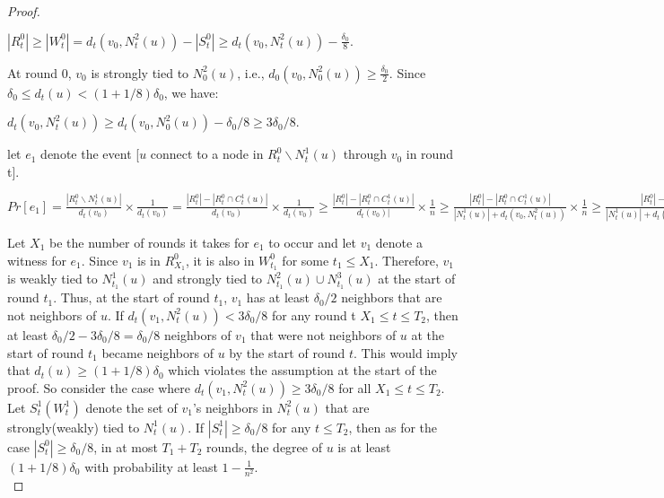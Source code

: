 \documentclass[
10pt, %
a4paper, %
oneside, %
headinclude,footinclude, %
BCOR5mm, %
]{scrartcl}
\begin{document}
\begin{proof}
	\begin{center}
		\begin{math}
		|R_t^0| \geq |W_t^0| = d_t(v_0, N_t^2(u)) - |S_t^0| \geq d_t(v_0, N_t^2(u)) - \frac{\delta_0}{8}. 
		\end{math}
	\end{center}
	At round $0$, $v_0$ is strongly tied to $N_0^2(u)$, i.e., $d_0(v_0, N_0^2(u)) \geq \frac{\delta_0}{2}$.
	Since $\delta_0 \leq d_t(u) < (1 + 1/8)\delta_0$, we have:
	\begin{center}
		\begin{math}
		d_t(v_0, N_t^2(u)) \geq d_t(v_0, N_0^2(u)) - \delta_0 / 8 \geq 3\delta_0/8.
		\end{math}
	\end{center}	
	let $e_1$ denote the event [$u$ connect to a node in $R_t^0 \backslash N_t^1(u)$ through $v_0$ in round t].
	\begin{center}
	 	\begin{math}
	 		Pr[e_1] = \frac{|R_t^0 \backslash N_t^1(u)|}{d_t(v_0)} \times \frac{1}{d_t(v_0)} = 
	 		\frac{|R_t^0| - |R_t^0 \cap C_t^1(u)|}{d_t(v_0)} \times \frac{1}{d_t(v_0)} \geq
	 		\frac{|R_t^0| - |R_t^0 \cap C_t^1(u)|}{d_t(v_0)|} \times \frac{1}{n} \geq
	 		\frac{|R_t^0| - |R_t^0 \cap C_t^1(u)|}{|N_t^1(u)| + d_t(v_0, N_t^2(u))} \times \frac{1}{n} \geq
	 		\frac{|R_t^0| - \delta_0/8}{|N_t^1(u)| + d_t(v_0, N_t^2(u))} \times \frac{1}{n} \geq
	 		\frac{d_t(v_0, N_t^2(u)) - \delta_0/8 - \delta_0/8}{|N_t^1(u)| + d_t(v_0, N_t^2(u))} \times \frac{1}{n} \geq 
	 		\frac{3\delta_0/8 - \delta_0/8}{|N_t^1(u)| + 3\delta_0/8} \times \frac{1}{n} \geq
	 		\frac{3\delta_0/8 - \delta_0/8}{(1+ 1/8)\delta_0 + 3\delta_0/8} \times \frac{1}{n} = 
	 		\frac{1}{12n}.
	 	\end{math}
	\end{center}
	Let $X_1$ be the number of rounds it takes for $e_1$ to occur and let $v_1$ denote a witness for $e_1$. Since $v_1$ is in $R_{X_1}^0$, it is also in $W_{t_1}^0$ for some $t_1 \leq X_1$. Therefore, $v_1$ is weakly tied to $N_{t_1}^1(u)$ and strongly tied to $N_{t_1}^2(u) \cup N_{t_1}^3(u)$ at the start of round $t_1$. Thus, at the start of round $t_1$, $v_1$ has at least $\delta_0/2$ neighbors that are not neighbors of $u$. 
	If $d_t(v_1, N_t^2(u)) < 3\delta_0/8$ for any round t $X_1 \leq t \leq T_2$, then at least $\delta_0/2 - 3\delta_0/8 = \delta_0/8$ neighbors of $v_1$ that were not neighbors of $u$ at the start of round $t_1$ became neighbors of $u$ by the start of round $t$. This would imply that $d_t(u) \geq (1 + 1/8)\delta_0$ which violates the assumption at the start of the proof. So consider the case where $d_t(v_1, N_t^2(u)) \geq 3\delta_0/8$ for all $X_1 \leq t \leq T_2$. Let $S_t^1(W_t^1)$ denote the set of $v_1$'s neighbors in $N_t^2(u)$ that are strongly(weakly) tied to $N_t^1(u)$. If $|S_t^1| \geq \delta_0 / 8$ for any $t \leq T_2$, then as for the case $|S_t^0| \geq \delta_0 / 8$, in at most $T_1 + T_2$ rounds, the degree of $u$ is at least $(1+ 1/8)\delta_0$ with probability at least $1 - \frac{1}{n^2}$.\\

\end{proof}
\end{document}
